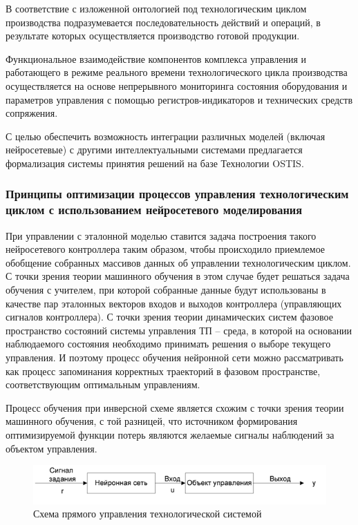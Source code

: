 В соответствие с изложенной онтологией под технологическим циклом производства подразумевается последовательность действий и операций, в результате которых осуществляется производство готовой продукции.

Функциональное взаимодействие компонентов комплекса управления и работающего в режиме реального времени технологического цикла производства осуществляется на основе непрерывного мониторинга состояния оборудования и параметров управления с помощью регистров-индикаторов и технических средств сопряжения.


С целью обеспечить возможность интеграции различных моделей (включая нейросетевые) с другими интеллектуальными системами предлагается формализация системы принятия решений на базе Технологии OSTIS.





\subsubsection{Принципы оптимизации процессов управления технологическим циклом с использованием нейросетевого моделирования}

При управлении с эталонной моделью ставится задача построения такого нейросетевого контроллера таким образом, чтобы происходило приемлемое обобщение собранных массивов данных об управлении технологическим циклом. С точки зрения теории машинного обучения в этом случае будет решаться задача обучения с учителем, при которой собранные данные будут использованы в качестве пар эталонных векторов входов и выходов контроллера (управляющих сигналов контроллера). С точки зрения теории динамических систем фазовое пространство состояний системы управления ТП – среда, в которой на основании наблюдаемого состояния необходимо принимать решения о выборе текущего управления. И поэтому процесс обучения нейронной сети можно рассматривать как процесс запоминания корректных траекторий в фазовом пространстве, соответствующим оптимальным управлениям. 



Процесс обучения при инверсной схеме является схожим с точки зрения теории машинного обучения, с той разницей, что источником формирования оптимизируемой функции потерь являются желаемые сигналы наблюдений за объектом управления.

\begin{figure}[H]
	\includegraphics[scale=0.8]{images/part7/chapter_enterprise/nncontrol_direct.png}
	\caption{Схема прямого управления технологической системой}
	\label{fig:nncontrol_direct}
\end{figure}

